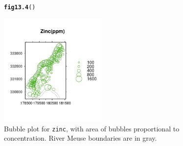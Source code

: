 \documentclass[12pt, a4paper,  BCOR=8.25mm, DIV=15]{scrartcl}\usepackage[]{graphicx}\usepackage[]{color}
\makeatletter
\newcommand{\hlstd}[1]{\textcolor[rgb]{0.345,0.345,0.345}{#1}}%
\newcommand{\hlkwd}[1]{\textcolor[rgb]{0.737,0.353,0.396}{\textbf{#1}}}%
\newenvironment{kframe}{%
 \def\at@end@of@kframe{}%
 \ifinner\ifhmode%
  \def\at@end@of@kframe{\end{minipage}}%
  \begin{minipage}{\columnwidth}%
 \fi\fi%
 \def\FrameCommand##1{\hskip\@totalleftmargin \hskip-\fboxsep
 \colorbox{shadecolor}{##1}\hskip-\fboxsep
     \hskip-\linewidth \hskip-\@totalleftmargin \hskip\columnwidth}%
 \MakeFramed {\advance\hsize-\width
   \@totalleftmargin\z@ \linewidth\hsize
   \@setminipage}}%
 {\par\unskip\endMakeFramed%
 \at@end@of@kframe}
\newenvironment{knitrout}{}{} %
\newcommand{\txtt}[1]{{\texttt{#1}}}
\makeatother
\begin{document}
\begin{figure}
\begin{knitrout}
\color{fgcolor}\begin{kframe}
\begin{alltt}
\hlkwd{fig13.4}\hlstd{()}
\end{alltt}
\end{kframe}

{\centering \includegraphics[width=0.47\textwidth]{figs/map-meuse-bubble-13_4-1} 

}



\end{knitrout}
 \caption{Bubble plot for \txtt{zinc},
with area of bubbles proportional to concentration.
River Meuse boundaries are in gray.\label{fig:ZnRiv}}
\end{figure}
\end{document}
